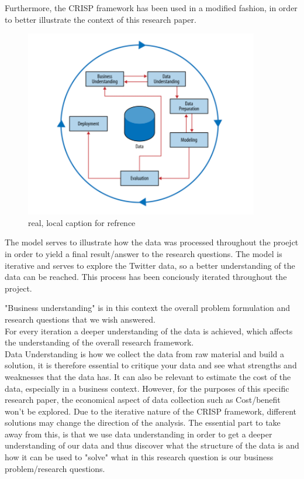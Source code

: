 \documentclass{article}
\begin{document}
Furthermore,  the CRISP framework has been used in a modified fashion, in order to better illustrate the context of this research paper.\\

\begin{figure}[H] %
	\centering %
\includegraphics [scale= .95]  {CRISP.PNG}    %
	\caption[Optional caption] {real, local caption for refrence}
	\label{fig:wordcloudBliz}

\end{figure}


The model serves to illustrate how the data was processed throughout the proejct in order to yield a final result/answer to the research questions. The model is iterative and serves to explore the Twitter data, so a better
understanding of the data can be reached. This process has been conciously iterated throughout the project.

"Business understanding" is in this context the overall problem formulation and research questions that we wish answered.\\
For every iteration a deeper understanding of the data is achieved, which affects the understanding of the overall research framework.\\

Data Understanding is how we collect the data from raw material and build a solution, it is therefore essential to critique your data and see what strengths and weaknesses that the data has. It can also be relevant to estimate the cost of the data, especially in a business context. However, for the purposes of this specific research paper, the economical aspect of data collection such as Cost/benefit won't be explored. Due to the iterative nature of the CRISP framework, different solutions may change the direction of the analysis. The essential part to take away from this, is that we use data understanding in order to get a deeper understanding of our data and thus discover what the structure of the data is and how it can be used to "solve" what in this research question is our business problem/research questions.
\end{document}
